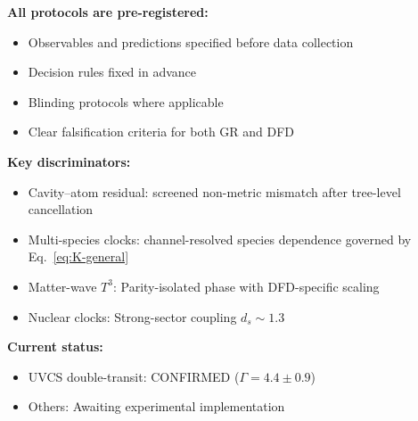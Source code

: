 \begin{tcolorbox}[colback=blue!5!white, colframe=blue!50!black, title=Experimental Protocol Summary]
\textbf{All protocols are pre-registered:}
\begin{itemize}[nosep]
\item Observables and predictions specified before data collection
\item Decision rules fixed in advance
\item Blinding protocols where applicable
\item Clear falsification criteria for both GR and DFD
\end{itemize}

\textbf{Key discriminators:}
\begin{itemize}[nosep]
\item Cavity--atom residual: screened non-metric mismatch after tree-level cancellation
\item Multi-species clocks: channel-resolved species dependence governed by Eq.~\eqref{eq:K-general}
\item Matter-wave $T^3$: Parity-isolated phase with DFD-specific scaling
\item Nuclear clocks: Strong-sector coupling $d_s \sim 1.3$
\end{itemize}

\textbf{Current status:}
\begin{itemize}[nosep]
\item UVCS double-transit: CONFIRMED ($\Gamma = 4.4 \pm 0.9$)
\item Others: Awaiting experimental implementation
\end{itemize}
\end{tcolorbox}
